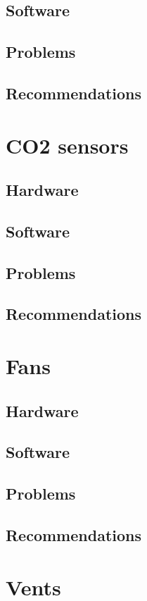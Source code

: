 \documentclass[a4paper,oneside]{book}
\begin{document}
\subsection{Software}
\subsection{Problems}
\subsection{Recommendations}

\section{CO2 sensors}
\subsection{Hardware}
\subsection{Software}
\subsection{Problems}
\subsection{Recommendations}

\section{Fans}
\label{sec:fans}
\subsection{Hardware}
\subsection{Software}
\subsection{Problems}
\subsection{Recommendations}

\section{Vents}
\end{document}
